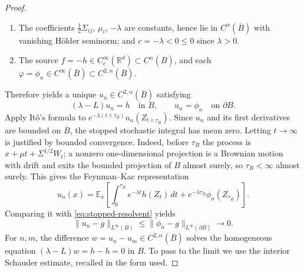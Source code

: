 \documentclass[aihp]{imsart}
\numberwithin{equation}{section}
\theoremstyle{plain}
\theoremstyle{definition}
\newcommand{\R}{\mathbb R}
\newcommand{\1}{\mathbf 1}
\begin{document}
\begin{proof}
\begin{enumerate}[label=\textup{(\alph*)}]
\item\label{it:gt-coeff} The coefficients $\tfrac12\Sigma_{ij}$, $\mu_i$, $-\lambda$ are constants, hence lie in $C^{\alpha}(\overline B)$ with vanishing H\"older seminorm; and $c=-\lambda<0\le0$ since $\lambda>0$.
\item\label{it:gt-data} The source $f=-h\in C_c^\infty(\R^d)\subset C^{\alpha}(\overline B)$, and each $\varphi=\phi_n\in C^\infty(\overline B)\subset C^{2,\alpha}(\overline B)$.
\end{enumerate}
Therefore \cite[Theorem~6.14]{GilbargTrudinger2001} yields a unique $u_n\in C^{2,\alpha}(\overline B)$ satisfying
\[
 (\lambda-L)u_n=h\quad\text{in }B,
 \qquad u_n=\phi_n\quad\text{on }\partial B.
\]
Apply It\^o's formula to $e^{-\lambda(t\wedge\tau_B)}u_n(Z_{t\wedge\tau_B})$. Since $u_n$ and its first derivatives are bounded on $\overline B$, the stopped stochastic integral has mean zero. Letting $t\to\infty$ is justified by bounded convergence. Indeed, before $\tau_B$ the process is $x+\mu t+\Sigma^{1/2}W_t$; a nonzero one-dimensional projection is a Brownian motion with drift and exits the bounded projection of $B$ almost surely, so $\tau_B<\infty$ almost surely. This gives the Feynman--Kac representation
\[
 u_n(x)=\mathbb E_x\left[
 \int_0^{\tau_B}e^{-\lambda t}h(Z_t)\,dt
 +e^{-\lambda\tau_B}\phi_n(Z_{\tau_B})
 \right].
\]
Comparing it with \eqref{eq:stopped-resolvent} yields
\[
 \|u_n-g\|_{L^\infty(B)}
 \le \|\phi_n-g\|_{L^\infty(\partial B)}\longrightarrow0.
\]
For $n,m$, the difference $w=u_n-u_m\in C^{2,\alpha}(\overline B)$ solves the homogeneous equation $(\lambda-L)w=h-h=0$ in $B$. To pass to the limit we use the interior Schauder estimate, recalled in the form used.


\end{proof}
\end{document}
